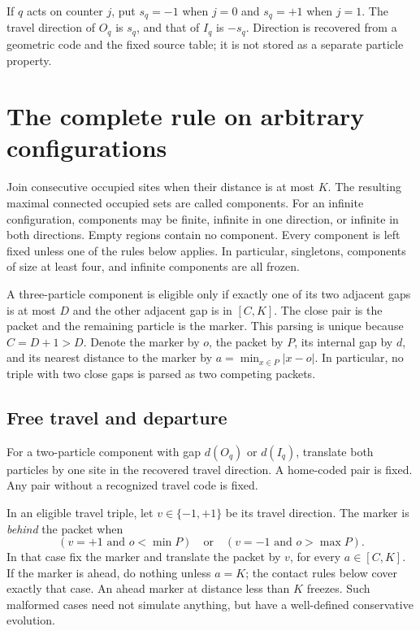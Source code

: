 \documentclass[11pt,a4paper]{article}
\numberwithin{equation}{section}
\begin{document}
If $q$ acts on counter $j$, put $s_q=-1$ when $j=0$ and $s_q=+1$ when $j=1$.
The travel direction of $O_q$ is $s_q$, and that of $I_q$ is $-s_q$.
Direction is recovered from a geometric code and the fixed source table;
it is not stored as a separate particle property.

\section{The complete rule on arbitrary configurations}\label{fpa:bc:sec:rule}
Join consecutive occupied sites when their distance is at most $K$.
The resulting maximal connected occupied sets are called components.
For an infinite configuration, components may be finite, infinite in one
direction, or infinite in both directions. Empty regions contain no component.
Every component is left fixed unless one of the rules below applies.
In particular, singletons, components of size at least four, and infinite
components are all frozen.

A three-particle component is eligible only if exactly one of its two adjacent
gaps is at most $D$ and the other adjacent gap is in $[C,K]$. The close pair is
the packet and the remaining particle is the marker. This parsing is unique
because $C=D+1>D$. Denote the marker by $o$, the packet by $P$, its internal
gap by $d$, and its nearest distance to the marker by
$a=\min_{x\in P}|x-o|$. In particular, no triple with two close gaps is parsed
as two competing packets.

\subsection{Free travel and departure}
For a two-particle component with gap $d(O_q)$ or $d(I_q)$, translate both
particles by one site in the recovered travel direction. A home-coded pair
is fixed. Any pair without a recognized travel code is fixed.

In an eligible travel triple, let $v\in\{-1,+1\}$ be its travel direction.
The marker is \emph{behind} the packet when
\[
 (v=+1\text{ and }o<\min P)\quad\text{or}\quad
 (v=-1\text{ and }o>\max P).
\]
In that case fix the marker and translate the packet by $v$, for every
$a\in[C,K]$. If the marker is ahead, do nothing unless $a=K$; the contact
rules below cover exactly that case. An ahead marker at distance less than
$K$ freezes. Such malformed cases need not simulate anything, but have a
well-defined conservative evolution.
\end{document}

